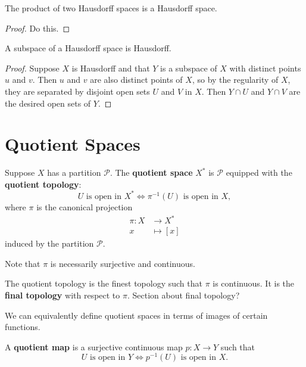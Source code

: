 \documentclass[twoside,10pt]{report}
\begin{document}
\begin{prop}
	The product of two Hausdorff spaces is a Hausdorff space.
\end{prop}
\begin{proof}
	{\color{red}Do this.}
\end{proof}

\begin{prop}
	A subspace of a Hausdorff space is Hausdorff.
\end{prop}
\begin{proof}
	Suppose $X$ is Hausdorff and that $Y$ is a subspace of $X$ with distinct points $u$ and $v$. Then $u$ and $v$ are also distinct points of $X$, so by the regularity of $X$, they are separated by disjoint open sets $U$ and $V$ in $X$. Then $Y \cap U$ and $Y \cap V$ are the desired open sets of $Y$.
\end{proof}



\section{Quotient Spaces}

\begin{defn}[]
Suppose $X$ has a partition $\mathcal{P}$. The \textbf{quotient space} $X^{*}$ is $\mathcal{P}$ equipped with the \textbf{quotient topology}:
\[
	U \text{ is open in } X^{*} \iff \pi^{-1}(U) \text{ is open in } X,
\] where $\pi$ is the canonical projection
\begin{align*}
	\pi:X&\to X^{*}\\
	x&\mapsto [x]
\end{align*}
induced by the partition $\mathcal{P}$.
\end{defn}
Note that $\pi$ is necessarily surjective and continuous.

\begin{note}[]
	The quotient topology is the finest topology such that $\pi$ is continuous. It is the \textbf{final topology} with respect to $\pi$. {\color{red}Section about final topology?}
\end{note}

We can equivalently define quotient spaces in terms of images of certain functions.

\begin{defn}[]
A \textbf{quotient map} is a surjective continuous map $p:X\to Y$ such that
\[
	U \text{ is open in } Y \iff p^{-1}(U) \text{ is open in } X.
\] 
\end{defn}
\end{document}
